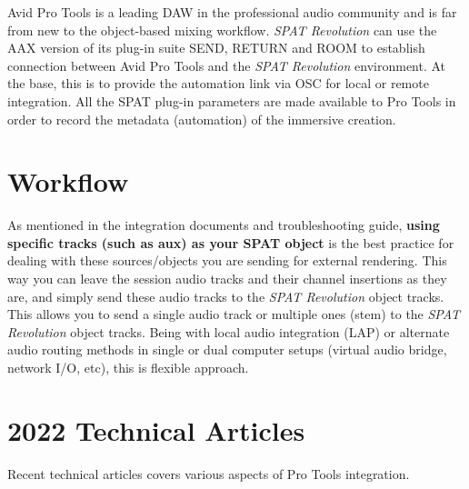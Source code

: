 \documentclass[
  letterpaper,
  DIV=11,
  numbers=noendperiod]{scrreport}
\begin{document}
Avid Pro Tools is a leading DAW in the professional audio community and
is far from new to the object-based mixing workflow. \emph{SPAT
Revolution} can use the AAX version of its plug-in suite SEND, RETURN
and ROOM to establish connection between Avid Pro Tools and the
\emph{SPAT Revolution} environment. At the base, this is to provide the
automation link via OSC for local or remote integration. All the SPAT
plug-in parameters are made available to Pro Tools in order to record
the metadata (automation) of the immersive creation.

\hypertarget{workflow}{%
\section{Workflow}\label{workflow}}

As mentioned in the integration documents and troubleshooting guide,
\textbf{using specific tracks (such as aux) as your SPAT object} is the
best practice for dealing with these sources/objects you are sending for
external rendering. This way you can leave the session audio tracks and
their channel insertions as they are, and simply send these audio tracks
to the \emph{SPAT Revolution} object tracks. This allows you to send a
single audio track or multiple ones (stem) to the \emph{SPAT Revolution}
object tracks. Being with local audio integration (LAP) or alternate
audio routing methods in single or dual computer setups (virtual audio
bridge, network I/O, etc), this is flexible approach.

\hypertarget{technical-articles}{%
\section{2022 Technical Articles}\label{technical-articles}}

Recent technical articles covers various aspects of Pro Tools
integration.
\end{document}
